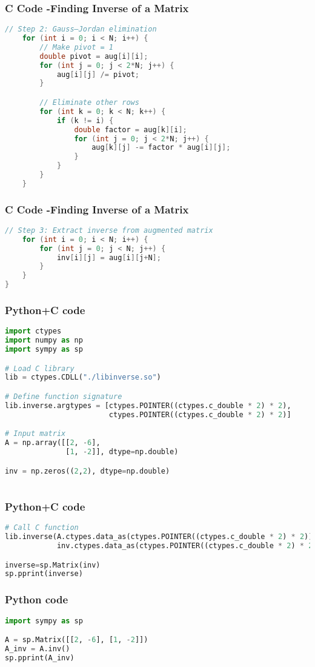 \documentclass{beamer}
\begin{document}
\begin{frame}[fragile]
    \frametitle{C Code -Finding Inverse of a Matrix}

    \begin{lstlisting}[language=C]
  // Step 2: Gauss–Jordan elimination
    for (int i = 0; i < N; i++) {
        // Make pivot = 1
        double pivot = aug[i][i];
        for (int j = 0; j < 2*N; j++) {
            aug[i][j] /= pivot;
        }

        // Eliminate other rows
        for (int k = 0; k < N; k++) {
            if (k != i) {
                double factor = aug[k][i];
                for (int j = 0; j < 2*N; j++) {
                    aug[k][j] -= factor * aug[i][j];
                }
            }
        }
    }


    \end{lstlisting}
\end{frame}

\begin{frame}[fragile]
    \frametitle{C Code -Finding Inverse of a Matrix}

    \begin{lstlisting}[language=C]
    // Step 3: Extract inverse from augmented matrix
    for (int i = 0; i < N; i++) {
        for (int j = 0; j < N; j++) {
            inv[i][j] = aug[i][j+N];
        }
    }
}
    \end{lstlisting}
\end{frame}

\begin{frame}[fragile]
    \frametitle{Python+C code}

    \begin{lstlisting}[language=Python]
import ctypes
import numpy as np
import sympy as sp

# Load C library
lib = ctypes.CDLL("./libinverse.so")

# Define function signature
lib.inverse.argtypes = [ctypes.POINTER((ctypes.c_double * 2) * 2),
                        ctypes.POINTER((ctypes.c_double * 2) * 2)]

# Input matrix
A = np.array([[2, -6],
              [1, -2]], dtype=np.double)

inv = np.zeros((2,2), dtype=np.double)



    \end{lstlisting}
\end{frame}

\begin{frame}[fragile]
    \frametitle{Python+C code}

    \begin{lstlisting}[language=Python]
# Call C function
lib.inverse(A.ctypes.data_as(ctypes.POINTER((ctypes.c_double * 2) * 2)),
            inv.ctypes.data_as(ctypes.POINTER((ctypes.c_double * 2) * 2)))

inverse=sp.Matrix(inv)
sp.pprint(inverse)
    \end{lstlisting}
\end{frame}


\begin{frame}[fragile]
    \frametitle{Python code}
    \begin{lstlisting}[language=Python]
import sympy as sp

A = sp.Matrix([[2, -6], [1, -2]])
A_inv = A.inv()
sp.pprint(A_inv) 
    \end{lstlisting}   
\end{frame}
\end{document}
